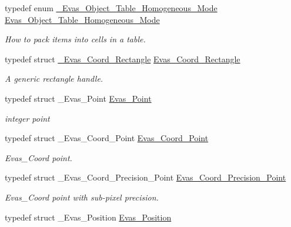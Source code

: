 \begin{DoxyCompactItemize}
typedef enum \hyperlink{group__Evas__Object__Table_ga536e8e3c9e38ee6d82f918a341b053a8}{\_\-Evas\_\-Object\_\-Table\_\-Homogeneous\_\-Mode} \hyperlink{group__Evas__Object__Table_ga04f33e792aea51d583c3e572a35ceebe}{Evas\_\-Object\_\-Table\_\-Homogeneous\_\-Mode}
\begin{DoxyCompactList}\small\item\em How to pack items into cells in a table. \item\end{DoxyCompactList}\item 
typedef struct \hyperlink{struct__Evas__Coord__Rectangle}{\_\-Evas\_\-Coord\_\-Rectangle} \hyperlink{Evas_8h_a23d14410ef9cd719fd61602ce68c4d42}{Evas\_\-Coord\_\-Rectangle}\label{Evas_8h_a23d14410ef9cd719fd61602ce68c4d42}

\begin{DoxyCompactList}\small\item\em A generic rectangle handle. \item\end{DoxyCompactList}\item 
typedef struct \_\-Evas\_\-Point \hyperlink{Evas_8h_adc20c4d74f28a08de32455f97946e6bd}{Evas\_\-Point}\label{Evas_8h_adc20c4d74f28a08de32455f97946e6bd}

\begin{DoxyCompactList}\small\item\em integer point \item\end{DoxyCompactList}\item 
typedef struct \_\-Evas\_\-Coord\_\-Point \hyperlink{Evas_8h_a9d3aab92b5b0911efb7594b79e0d3f37}{Evas\_\-Coord\_\-Point}\label{Evas_8h_a9d3aab92b5b0911efb7594b79e0d3f37}

\begin{DoxyCompactList}\small\item\em Evas\_\-Coord point. \item\end{DoxyCompactList}\item 
typedef struct \_\-Evas\_\-Coord\_\-Precision\_\-Point \hyperlink{Evas_8h_a27d3d206dd0447c96df4385cee0c5df2}{Evas\_\-Coord\_\-Precision\_\-Point}\label{Evas_8h_a27d3d206dd0447c96df4385cee0c5df2}

\begin{DoxyCompactList}\small\item\em Evas\_\-Coord point with sub-\/pixel precision. \item\end{DoxyCompactList}\item 
typedef struct \_\-Evas\_\-Position \hyperlink{Evas_8h_a1fedb06548c63e95cdef58ae2578e494}{Evas\_\-Position}\label{Evas_8h_a1fedb06548c63e95cdef58ae2578e494}


\end{DoxyCompactItemize}
